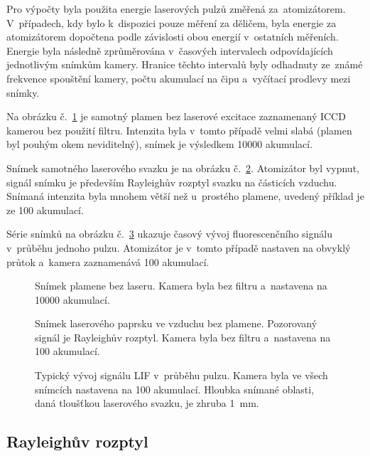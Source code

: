 Pro výpočty byla použita energie laserových pulzů změřená za~atomizátorem.
V~případech, kdy bylo k~dispozici pouze měření za děličem,
byla energie za atomizátorem dopočtena podle závislosti obou energií
v~ostatních měřeních.
Energie byla následně zprůměrována v~časových intervalech odpovídajících
jednotlivým snímkům kamery.
Hranice těchto intervalů byly odhadnuty ze~známé frekvence spouštění
kamery, počtu akumulací na čipu a~vyčítací prodlevy mezi sním\-ky.

Na obrázku č.~\ref{fig:lif-flame} je samotný plamen bez laserové excitace
zaznamenaný ICCD kamerou bez použití filtru.
Intenzita byla v~tomto případě velmi slabá
(plamen byl pouhým okem neviditelný),
snímek je výsledkem \num{10000} akumulací.

Snímek samotného laserového svazku je na obrázku č.~\ref{fig:lif-beam}.
Atomizátor byl vypnut, signál snímku je především Rayleighův rozptyl
svazku na částicích vzduchu.
Snímaná intenzita byla mnohem větší než u~prostého plamene,
uvedený příklad je ze \num{100} akumulací.

Série snímků na obrázku č.~\ref{fig:lif-timeev} ukazuje časový vývoj
fluorescenčního signálu v~průběhu jednoho pulzu.
Atomizátor je v~tomto případě nastaven na obvyklý průtok
a~kamera zaznamenává 100 akumulací.

\begin{figure}[p]
	\centering
	
	\caption{Snímek plamene bez laseru.
		Kamera byla bez filtru a~nastavena na \num{10000} akumulací.}
	\label{fig:lif-flame}
\end{figure}
\begin{figure}[p]
	\centering
	
	\caption{Snímek laserového paprsku ve vzduchu bez plamene.
		Pozorovaný signál je Rayleighův rozptyl.
		Kamera byla bez filtru a~nastavena na \num{100} akumulací.}
	\label{fig:lif-beam}
\end{figure}

\begin{figure}[p]
	\centering
	
	\caption{Typický vývoj signálu LIF v~průběhu pulzu.
		Kamera byla ve všech snímcích nastavena na \num{100} akumulací.
		Hloubka snímané oblasti, daná tloušťkou laserového svazku,
		je zhruba \SI{1}{\milli\metre}.}
	\label{fig:lif-timeev}
\end{figure}

\subsection{Rayleighův rozptyl}
\label{sec:lif-rayleigh}

